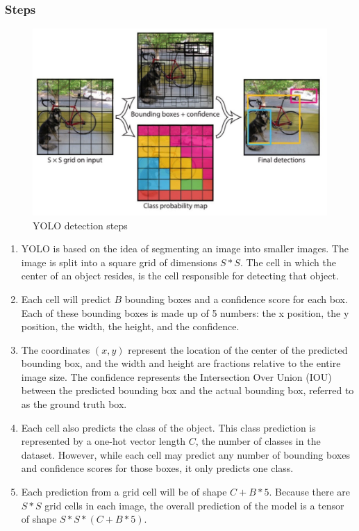 \subsubsection{Steps}

\begin{figure}[h!]
	\centering
	\includegraphics[width=0.7\linewidth]{Images/yolo_steps}
	\caption{YOLO detection steps}
\end{figure}

\begin{enumerate}
	\item YOLO is based on the idea of segmenting an image into smaller images. The image is split into a square grid of dimensions $S*S$. The cell in which the center of an object resides, is the cell responsible for detecting that object. 
	
	\item Each cell will predict $B$ bounding boxes and a confidence score for each box. Each of these bounding boxes is made up of 5 numbers: the x position, the y position, the width, the height, and the confidence. 
	
	\item The coordinates $(x, y)$ represent the location of the center of the predicted bounding box, and the width and height are fractions relative to the entire image size. The confidence represents the Intersection Over Union (IOU) between the predicted bounding box and the actual bounding box, referred to as the ground truth box. 
	
	\item Each cell also predicts the class of the object. This class prediction is represented by a one-hot vector length $C$, the number of classes in the dataset. However, while each cell may predict any number of bounding boxes and confidence scores for those boxes, it only predicts one class. 
	
	\item Each prediction from a grid cell will be of shape $C + B * 5$. Because there are $S*S$ grid cells in each image, the overall prediction of the model is a tensor of shape $S*S*(C+B*5)$.
\end{enumerate}

